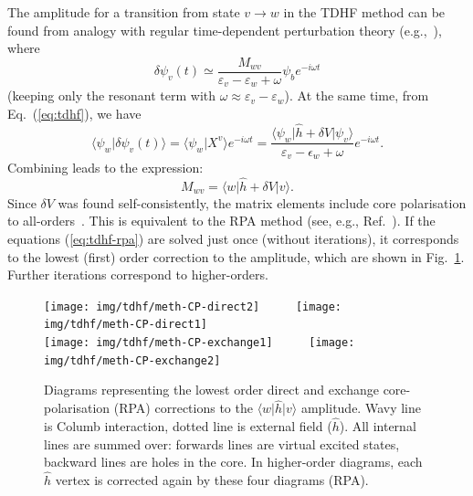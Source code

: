 \documentclass[10pt,twocolumn,a4paper]{article}%
\newcommand{\bra}[1]{\ensuremath{\langle #1|}}	%
\newcommand{\ket}[1]{\ensuremath{|#1\rangle}}	%
\newcommand{\braket}[1]{\ensuremath{\langle #1\rangle}}	%
\newcommand{\be}{\begin{equation}}
\newcommand{\ee}{\end{equation}}
\def\e{\ensuremath{\epsilon}}
\def\en{\ensuremath{\varepsilon}}
\newcommand{\w}{\ensuremath{\omega}}
\begin{document}
The amplitude for a transition from state $v\to w$ in the TDHF method can be found from analogy with regular time-dependent perturbation theory (e.g.,~\cite{Sakurai2011}), where 
\[
\delta\psi_v(t) \simeq \frac{M_{wv}}{\en_v-\en_w+\w}\psi_be^{-i\w t}
\]
(keeping only the resonant term with $\w\approx\en_v-\en_w$).
At the same time, from Eq.~(\ref{eq:tdhf}), we have
\be
\braket{\psi_w | \delta\psi_v(t)} = \braket{\psi_w | X^v}e^{-i\w t}
= \frac{\bra{\psi_w} \hat h + \delta V \ket{\psi_v}}{\en_v - \e_w + \w}e^{-i\w t}.
\ee
Combining leads to the expression: %
\be
M_{wv} = \bra{w}\hat h + \delta V\ket{v}.
\ee
Since $\delta V$ was found self-consistently, the matrix elements include core polarisation  to all-orders~\cite{DzubaHFS1984,Dzuba1987jpbRPA}.
This is equivalent to the RPA method (see, e.g., Ref.~\cite{JohnsonBook2007}).
If the equations (\ref{eq:tdhf-rpa}) are solved just once (without iterations), it corresponds to the lowest (first) order correction to the amplitude, which are shown in Fig.~\ref{fig:corePol}.
Further iterations correspond to higher-orders.


\begin{figure}%
\centering
\texttt{[image: img/tdhf/meth-CP-direct2]}~~~~~
\texttt{[image: img/tdhf/meth-CP-direct1]}\\
\texttt{[image: img/tdhf/meth-CP-exchange1]}~~~~~
\texttt{[image: img/tdhf/meth-CP-exchange2]}
\caption{\small Diagrams representing the lowest order direct and exchange core-polarisation (RPA) corrections to the $\bra{w}\hat h\ket{v}$ amplitude.
Wavy line is Columb interaction, dotted line is external field ($\hat h$). All internal lines are summed over: forwards lines are virtual excited states, backward lines are holes in the core.
In higher-order diagrams, each $\hat h$ vertex is corrected again by these four diagrams (RPA).\label{fig:corePol}}
\end{figure}
\end{document}
